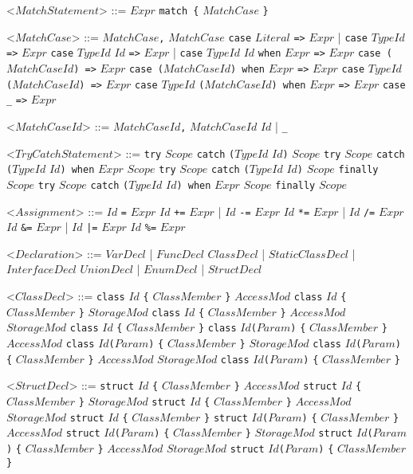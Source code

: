 \documentclass{article}
\newcommand{\gtext}[1]{<$#1$>}
\newcommand{\glit}[1]{\texttt{#1}}
\begin{document}
\begin{grammar}
	\newpage	
	
	\gtext{MatchStatement} ::= $Expr$ \glit{match \{} $MatchCase$ \glit{\}} 
	
	\gtext{MatchCase} ::= $MatchCase$\glit{,} $MatchCase$
	\alt \glit{case} $Literal$ \glit{=>} $Expr$ | \glit{case} $TypeId$ \glit{=>} $Expr$ 
	\alt \glit{case} $TypeId$ $Id$ \glit{=>} $Expr$ | \glit{case} $TypeId$ $Id$ \glit{when} $Expr$ \glit{=>} $Expr$ 
	\alt \glit{case (}$MatchCaseId$\glit{) =>} $Expr$
	\alt \glit{case (}$MatchCaseId$\glit{) when} $Expr$ \glit{=>} $Expr$ 
	\alt \glit{case} $TypeId$ \glit{(}$MatchCaseId$\glit{) =>} $Expr$
	\alt \glit{case} $TypeId$ \glit{(}$MatchCaseId$\glit{) when} $Expr$ \glit{=>} $Expr$ 
	\alt \glit{case} \glit{_} \glit{=>} $Expr$
	
	\gtext{MatchCaseId} ::= $MatchCaseId$\glit{,} $MatchCaseId$
	\alt $Id$ | \glit{_}

	\gtext{TryCatchStatement} ::= \glit{try} $Scope$ \glit{catch} \glit{(}$TypeId$ $Id$\glit{)} $Scope$
	\alt \glit{try} $Scope$ \glit{catch} \glit{(}$TypeId$ $Id$\glit{) when} $Expr$ $Scope$  
	\alt \glit{try} $Scope$ \glit{catch} \glit{(}$TypeId$ $Id$\glit{)} $Scope$ \glit{finally} $Scope$
	\alt \glit{try} $Scope$ \glit{catch} \glit{(}$TypeId$ $Id$\glit{) when} $Expr$ $Scope$ \glit{finally} $Scope$

	\gtext{Assignment} ::= $Id$ \glit{=} $Expr$
	\alt $Id$ \glit{+=} $Expr$ | $Id$ \glit{-=} $Expr$
	\alt $Id$ \glit{*=} $Expr$ | $Id$ \glit{/=} $Expr$
	\alt $Id$ \glit{\&=} $Expr$ | $Id$ \glit{|=} $Expr$
	\alt $Id$ \glit{\%=} $Expr$
	
	\gtext{Declaration} ::=  $VarDecl$ | $FuncDecl$ %
	\alt $ClassDecl$ | $StaticClassDecl$ |  $InterfaceDecl$ %
	\alt $UnionDecl$ | $EnumDecl$ | $StructDecl$ %
	
	\gtext{ClassDecl} ::= \glit{class} $Id$ \glit{\{} $ClassMember$ \glit{\}}
	\alt $AccessMod$ \glit{class} $Id$ \glit{\{} $ClassMember$ \glit{\}}
	\alt $StorageMod$ \glit{class} $Id$ \glit{\{} $ClassMember$ \glit{\}}
	\alt $AccessMod$ $StorageMod$ \glit{class} $Id$ \glit{\{} $ClassMember$ \glit{\}}
	\alt \glit{class} $Id$\glit{(}$Param$\glit{)} \glit{\{} $ClassMember$ \glit{\}}
	\alt $AccessMod$ \glit{class} $Id$\glit{(}$Param$\glit{)} \glit{\{} $ClassMember$ \glit{\}}
	\alt $StorageMod$ \glit{class} $Id$\glit{(}$Param$\glit{)} \glit{\{} $ClassMember$ \glit{\}}
	\alt $AccessMod$ $StorageMod$ \glit{class} $Id$\glit{(}$Param$\glit{)} \glit{\{} $ClassMember$ \glit{\}}
	
	\gtext{StructDecl} ::= \glit{struct} $Id$ \glit{\{} $ClassMember$ \glit{\}}
	\alt $AccessMod$ \glit{struct} $Id$ \glit{\{} $ClassMember$ \glit{\}}
	\alt $StorageMod$ \glit{struct} $Id$ \glit{\{} $ClassMember$ \glit{\}}
	\alt $AccessMod$ $StorageMod$ \glit{struct} $Id$ \glit{\{} $ClassMember$ \glit{\}}
	\alt \glit{struct} $Id$\glit{(}$Param$\glit{)} \glit{\{} $ClassMember$ \glit{\}}
	\alt $AccessMod$ \glit{struct} $Id$\glit{(}$Param$\glit{)} \glit{\{} $ClassMember$ \glit{\}}
	\alt $StorageMod$ \glit{struct} $Id$\glit{(}$Param$\glit{)} \glit{\{} $ClassMember$ \glit{\}}
	\alt $AccessMod$ $StorageMod$ \glit{struct} $Id$\glit{(}$Param$\glit{)} \glit{\{} $ClassMember$ \glit{\}}
	

\end{grammar}
\end{document}
